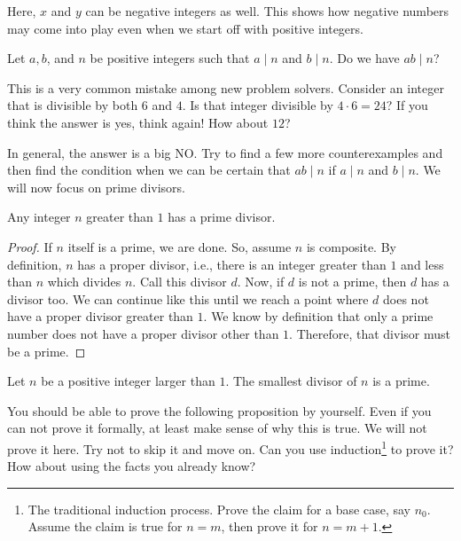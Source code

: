 \begin{note}
	Here, $x$ and $y$ can be negative integers as well. This shows how negative numbers may come into play even when we start off with positive integers.
\end{note}

\begin{question}
	Let $a,b$, and $n$ be positive integers such that $a\mid n$ and $b\mid n$. Do we have $ab \mid n$?
\end{question}
This is a very common mistake among new problem solvers. Consider an integer that is divisible by both $6$ and $4$. Is that integer divisible by $4\cdot6=24$? If you think the answer is yes, think again! How about $12$?

In general, the answer is a big NO. Try to find a few more counterexamples and then find the condition when we can be certain that $ab \mid n$ if $a\mid n$ and $b\mid n$. We will now focus on prime divisors.

\begin{proposition}
	Any integer $n$ greater than $1$ has a prime divisor.
\end{proposition}

\begin{proof}
	If $n$ itself is a prime, we are done. So, assume $n$ is composite. By definition, $n$ has a proper divisor, i.e., there is an integer greater than $1$ and less than $n$ which divides $n$. Call this divisor $d$. Now, if $d$ is not a prime, then $d$ has a divisor too. We can continue like this until we reach a point where $d$ does not have a proper divisor greater than $1$. We know by definition that only a prime number does not have a proper divisor other than $1$. Therefore, that divisor must be a prime.
\end{proof}

\begin{corollary}\label{cor:smallestdivisor}
	Let $n$ be a positive integer larger than $1$. The smallest divisor of $n$ is a prime.
\end{corollary}

You should be able to prove the following proposition by yourself. Even if you can not prove it formally, at least make sense of why this is true. We will not prove it here. Try not to skip it and move on. Can you use induction\footnote{The traditional induction process. Prove the claim for a base case, say $n_0$. Assume the claim is true for $n=m$, then prove it for $n=m+1$.} to prove it? How about using the facts you already know?

